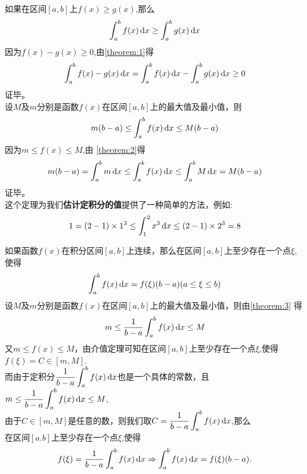 \theorem[定上下限积分性质4]
\label{theorem:2}
如果在区间$[a,b]$上$f(x)\geq g(x)$,那么
\begin{equation}
	\int_{a}^{b}f(x) \,{\rm{d}} x\geq \int_{a}^{b}g(x) \,{\rm{d}} x
\end{equation}
\proof 因为$f(x)-g(x)\geq0$,由\ref{theorem:1}\hspace*{0.3em}得
\begin{equation}
	\int_{a}^{b}f(x)-g(x) \,{\rm{d}} x=\int_{a}^{b}f(x) \,{\rm{d}} x-\int_{a}^{b}g(x) \,
	{\rm{d}} x\geq0
\end{equation}
证毕。\\

\vspace*{-1em}
\theorem[定上下限积分性质5]
\label{theorem:3}
设$M$及$m$分别是函数$f(x)$在区间$[a,b]$上的最大值及最小值，则
\begin{equation}
	m(b-a)\leq \int_{a}^{b}f(x) \,{\rm{d}} x\leq M(b-a)
\end{equation}
\proof 因为$m\leq f(x)\leq M$,由 \ref{theorem:2}\hspace*{0.3em}得
\vspace*{-1em} 
\begin{equation}
	\nonumber
	m(b-a)=\int_{a}^{b}m \,{\rm{d}} x\leq \int_{a}^{b}f(x) \,{\rm{d}} x\leq \int_{a}^{b}M \,{\rm{d}} x=M(b-a)
\end{equation}
证毕。\\
\hspace*{2em} 这个定理为我们\textbf{估计定积分的值}提供了一种简单的方法，例如:
\begin{equation}
	\nonumber
	1=(2-1)\times1^3\leq \int_{1}^{2}x^3 \,{\rm{d}} x\leq (2-1)\times2^3=8
\end{equation}

\vspace*{-1em}
\theorem[积分中值定理]
\label{theorem:4}
如果函数$f(x)$在积分区间$[a,b]$上连续，那么在区间$[a,b]$上至少存在一个点$\xi$,使得
\begin{equation}
	\int_{a}^{b}f(x)\,{\rm{d}} x=f(\xi)(b-a)(a\leq\xi\leq b)
\end{equation}
\proof 设$M$及$m$分别是函数$f(x)$在区间$[a,b]$上的最大值及最小值，则由\ref{theorem:3}\hspace*{0.3em} 得
\begin{equation}
	\nonumber
	m\leq\frac{1}{b-a}\int_{a}^{b}f(x) \,{\rm{d}} x\leq M
\end{equation}
又$m\leq f(x)\leq M$，由介值定理可知在区间$[a,b]$上至少存在一个点$\xi$,使得$f(\xi)=C\in[m,M]$.\vspace{0.5em}\\
而由于定积分$\displaystyle\frac{1}{b-a}\int_{a}^{b}f(x)\,{\rm{d}} x$也是一个具体的常数，且$\displaystyle m\leq\frac{1}{b-a}\int_{a}^{b}f(x) \,{\rm{d}} x\leq M$,\\
由于$C\in [m,M]$是任意的数，则我们取$C=\displaystyle\frac{1}{b-a}\int_{a}^{b}f(x) \,{\rm{d}} x$,那么\\
在区间$[a.b]$上至少存在一个点$\xi$,使得
\begin{equation}
	\nonumber
	f(\xi)=\frac{1}{b-a}\int_{a}^{b}f(x)\,{\rm{d}} x \Rightarrow \int_{a}^{b}f(x)\,{\rm{d}} x=f(\xi)(b-a).
\end{equation}

